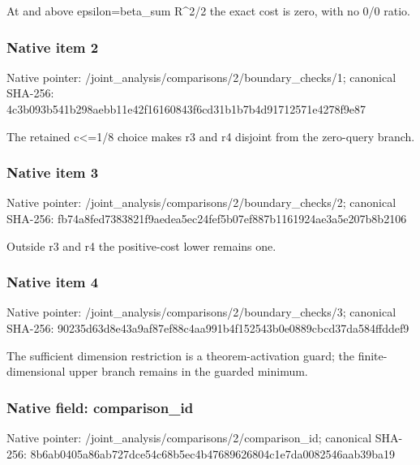 \documentclass[10pt,a4paper]{article}
\begin{document}
\begingroup\raggedright\sloppy At and above epsilon=\allowbreak{}beta\_\allowbreak{}sum R\textasciicircum{}2/\allowbreak{}2 the exact cost is zero,\allowbreak{} with no 0/\allowbreak{}0 ratio.\par\endgroup

\subsubsection{Native item 2}
Native pointer: /joint\_\allowbreak{}analysis/comparisons/2/boundary\_\allowbreak{}checks/1; canonical SHA-256: 4c3b093b541b298aebb11e42f16160843f6cd31b1b7b4d91712571e4278f9e87

\begingroup\raggedright\sloppy The retained c<=\allowbreak{}1/\allowbreak{}8 choice makes r3 and r4 disjoint from the zero-query branch.\par\endgroup

\subsubsection{Native item 3}
Native pointer: /joint\_\allowbreak{}analysis/comparisons/2/boundary\_\allowbreak{}checks/2; canonical SHA-256: fb74a8fed7383821f9aedea5ec24fef5b07ef887b1161924ae3a5e207b8b2106

\begingroup\raggedright\sloppy Outside r3 and r4 the positive-cost lower remains one.\par\endgroup

\subsubsection{Native item 4}
Native pointer: /joint\_\allowbreak{}analysis/comparisons/2/boundary\_\allowbreak{}checks/3; canonical SHA-256: 90235d63d8e43a9af87ef88c4aa991b4f152543b0e0889cbcd37da584ffddef9

\begingroup\raggedright\sloppy The sufficient dimension restriction is a theorem-activation guard;\allowbreak{} the finite-dimensional upper branch remains in the guarded minimum.\par\endgroup

\subsubsection{Native field: comparison\_\allowbreak{}id}
Native pointer: /joint\_\allowbreak{}analysis/comparisons/2/comparison\_\allowbreak{}id; canonical SHA-256: 8b6ab0405a86ab727dce54c68b5ec4b47689626804c1e7da0082546aab39ba19
\end{document}
